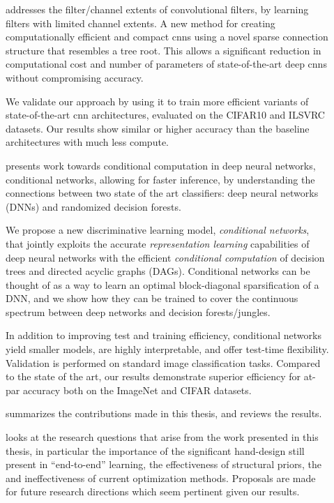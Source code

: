 \documentclass[thesis]{subfiles}
\begin{document}
\begin{description}
	\item[] addresses the filter/channel extents of convolutional filters, by learning filters with limited channel extents. A new method for creating computationally efficient and compact \glspl{cnn} using a novel sparse connection structure that resembles a tree root. This allows a significant reduction in computational cost and number of parameters of state-of-the-art deep \glspl{cnn} without compromising accuracy. 
	
	We validate our approach by using it to train more efficient variants of state-of-the-art \gls{cnn} architectures, evaluated on the CIFAR10 and ILSVRC datasets. Our results show similar or higher accuracy than the baseline architectures with much less compute. %
	
	\item[] presents work towards conditional computation in deep neural networks, conditional networks, allowing for faster inference, by understanding the connections between two state of the art classifiers: deep neural networks (DNNs) and randomized decision forests.
	
	We propose a new discriminative learning model, \emph{conditional networks}, 
	that jointly exploits the accurate \emph{representation learning} capabilities of deep neural networks with the efficient \emph{conditional computation} of decision trees and directed acyclic graphs (DAGs).
	Conditional networks can be thought of as a way to learn an optimal block-diagonal sparsification of a DNN, and we show how they can be trained to cover the continuous spectrum between deep networks and decision forests/jungles. 
	
	In addition to improving test and training efficiency, conditional networks yield smaller models, are highly interpretable, and offer test-time flexibility. Validation is performed on standard image classification tasks. Compared to the state of the art, our results demonstrate superior efficiency for at-par accuracy both on the ImageNet and CIFAR datasets.
	
	\item[] summarizes the contributions made in this thesis, and reviews the results.
	
	\item[] looks at the research questions that arise from the work presented in this thesis, in particular the importance of the significant hand-design still present in ``end-to-end'' learning, the effectiveness of structural priors, the and ineffectiveness of current optimization methods. Proposals are made for future research directions which seem pertinent given our results.
	
\end{description}
\end{document}
